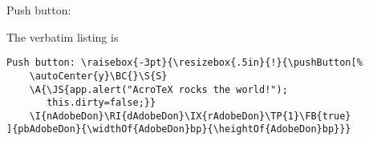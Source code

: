 \documentclass{article}
\begin{document}
Push button: 


\medskip The verbatim listing is
\begin{small}
\begin{Verbatim}[fontsize=\small]
Push button: \raisebox{-3pt}{\resizebox{.5in}{!}{\pushButton[%
    \autoCenter{y}\BC{}\S{S}
    \A{\JS{app.alert("AcroTeX rocks the world!");
       this.dirty=false;}}
    \I{nAdobeDon}\RI{dAdobeDon}\IX{rAdobeDon}\TP{1}\FB{true}
]{pbAdobeDon}{\widthOf{AdobeDon}bp}{\heightOf{AdobeDon}bp}}}
\end{Verbatim}
\end{small}
\end{document}
